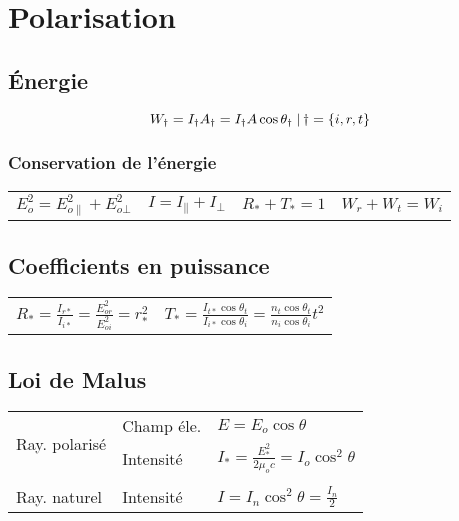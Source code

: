 \section{Polarisation}
\vspace{-2\baselineskip}
\begin{center}
    
\end{center}
\vspace{-\baselineskip}
\subsection{Énergie}
\[W_{\dag}=I_{\dag}A_{\dag}=I_{\dag}A\cos{\theta_{\dag}} \;|\, \dag=\qty{i,r,t}\]
\subsubsection{Conservation de l'énergie}
\addtolength{\tabcolsep}{-3pt}    
\begin{tabular}{cccc}
    \(E_o^2=E_{o\parallel}^2+E_{o\bot}^2\) & \(I=I_{\parallel}+I_{\bot}\) & \(R_\ast+T_\ast=1\) & \(W_r+W_t=W_i\) \\
\end{tabular}
\addtolength{\tabcolsep}{3pt}    

\subsection{Coefficients en puissance}
\begin{center}
    \begin{tabular}{ll}
    \(R_\ast=\frac{I_{r\ast}}{I_{i\ast}}=\frac{E_{or}^2}{E_{oi}^2}=r_{\ast}^2\) & \(T_\ast=\frac{I_{t\ast}\cos{\theta_t}}{I_{i\ast}\cos{\theta_i}}=\frac{n_t\cos{\theta_t}}{n_i\cos{\theta_i}}t^2\)
    \end{tabular}    
\end{center}

\subsection{Loi de Malus}
\begin{tabular}{lll}
    \multirow{2}{*}{Ray. polarisé} & Champ éle. & \(E=E_o\cos{\theta}\) \\
    & Intensité & \(I_{\ast}=\frac{E_{\ast}^2}{2\mu_o c}=I_o\cos^2{\theta}\)\\\hline\\[-1em]
    Ray. naturel & Intensité &\(I=I_n\cos^2{\theta}=\frac{I_n}{2}\)
\end{tabular}

